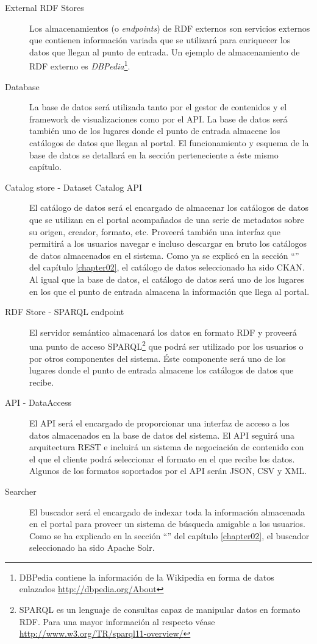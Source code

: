 \begin{description}
	\item[External RDF Stores]  Los almacenamientos (o \textit{endpoints}) de RDF externos son servicios externos que contienen información variada que se utilizará para enriquecer los datos que llegan al punto de entrada.  Un ejemplo de almacenamiento de RDF externo es \textit{DBPedia}\footnote{DBPedia contiene la información de la Wikipedia en forma de datos enlazados \url{http://dbpedia.org/About}}.
	\item[Database]  La base de datos será utilizada tanto por el gestor de contenidos y el framework de visualizaciones como por el API.  La base de datos será también uno de los lugares donde el punto de entrada almacene los catálogos de datos que llegan al portal.  El funcionamiento y esquema de la base de datos se detallará en la sección  perteneciente a éste mismo capítulo.
	\item[Catalog store - Dataset Catalog API]  El catálogo de datos será el encargado de almacenar los catálogos de datos que se utilizan en el portal acompañados de una serie de metadatos sobre su origen, creador, formato, etc.  Proveerá también una interfaz que permitirá a los usuarios navegar e incluso descargar en bruto los catálogos de datos almacenados en el sistema.  Como ya se explicó en la sección ``'' del capítulo \ref{chapter02}, el catálogo de datos seleccionado ha sido CKAN.  Al igual que la base de datos, el catálogo de datos será uno de los lugares en los que el punto de entrada almacena la información que llega al portal.
	\item[RDF Store - SPARQL endpoint]  El servidor semántico almacenará los datos en formato RDF y proveerá una punto de acceso SPARQL\footnote{SPARQL es un lenguaje de consultas capaz de manipular datos en formato RDF.  Para una mayor información al respecto véase \url{http://www.w3.org/TR/sparql11-overview/}} que podrá ser utilizado por los usuarios o por otros componentes del sistema.  Éste componente será uno de los lugares donde el punto de entrada almacene los catálogos de datos que recibe.
	\item[API - DataAccess]  El API será el encargado de proporcionar una interfaz de acceso a los datos almacenados en la base de datos del sistema.  El API seguirá una arquitectura REST e incluirá un sistema de negociación de contenido con el que el cliente podrá seleccionar el formato en el que recibe los datos.  Algunos de los formatos soportados por el API serán JSON, CSV y XML.
	\item[Searcher]  El buscador será el encargado de indexar toda la información almacenada en el portal para proveer un sistema de búsqueda amigable a los usuarios.  Como se ha explicado en la sección ``'' del capítulo \ref{chapter02}, el buscador seleccionado ha sido Apache Solr.

\end{description}
